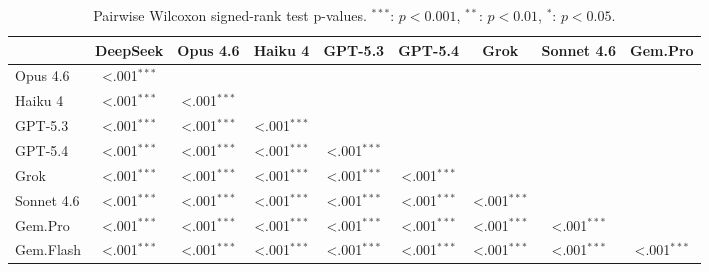 \begin{table}[t]
\centering
\scriptsize
\caption{Pairwise Wilcoxon signed-rank test p-values. $^{***}$: $p<0.001$, $^{**}$: $p<0.01$, $^{*}$: $p<0.05$.}
\label{tab:significance}
\begin{tabular}{lcccccccc}
\toprule
 & DeepSeek & Opus 4.6 & Haiku 4 & GPT-5.3 & GPT-5.4 & Grok & Sonnet 4.6 & Gem.Pro \\
\midrule
Opus 4.6 & <.001$^{***}$ \\
Haiku 4 & <.001$^{***}$ & <.001$^{***}$ \\
GPT-5.3 & <.001$^{***}$ & <.001$^{***}$ & <.001$^{***}$ \\
GPT-5.4 & <.001$^{***}$ & <.001$^{***}$ & <.001$^{***}$ & <.001$^{***}$ \\
Grok & <.001$^{***}$ & <.001$^{***}$ & <.001$^{***}$ & <.001$^{***}$ & <.001$^{***}$ \\
Sonnet 4.6 & <.001$^{***}$ & <.001$^{***}$ & <.001$^{***}$ & <.001$^{***}$ & <.001$^{***}$ & <.001$^{***}$ \\
Gem.Pro & <.001$^{***}$ & <.001$^{***}$ & <.001$^{***}$ & <.001$^{***}$ & <.001$^{***}$ & <.001$^{***}$ & <.001$^{***}$ \\
Gem.Flash & <.001$^{***}$ & <.001$^{***}$ & <.001$^{***}$ & <.001$^{***}$ & <.001$^{***}$ & <.001$^{***}$ & <.001$^{***}$ & <.001$^{***}$ \\
\bottomrule
\end{tabular}
\end{table}
